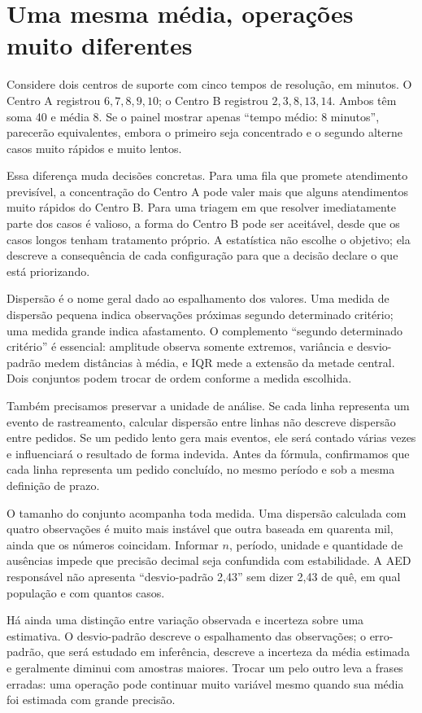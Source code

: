\section{Uma mesma média, operações muito diferentes}

Considere dois centros de suporte com cinco tempos de resolução, em minutos. O Centro A registrou $6,7,8,9,10$; o Centro B registrou $2,3,8,13,14$. Ambos têm soma 40 e média 8. Se o painel mostrar apenas ``tempo médio: 8 minutos'', parecerão equivalentes, embora o primeiro seja concentrado e o segundo alterne casos muito rápidos e muito lentos.

Essa diferença muda decisões concretas. Para uma fila que promete atendimento previsível, a concentração do Centro A pode valer mais que alguns atendimentos muito rápidos do Centro B. Para uma triagem em que resolver imediatamente parte dos casos é valioso, a forma do Centro B pode ser aceitável, desde que os casos longos tenham tratamento próprio. A estatística não escolhe o objetivo; ela descreve a consequência de cada configuração para que a decisão declare o que está priorizando.

Dispersão é o nome geral dado ao espalhamento dos valores. Uma medida de dispersão pequena indica observações próximas segundo determinado critério; uma medida grande indica afastamento. O complemento ``segundo determinado critério'' é essencial: amplitude observa somente extremos, variância e desvio-padrão medem distâncias à média, e IQR mede a extensão da metade central. Dois conjuntos podem trocar de ordem conforme a medida escolhida.

Também precisamos preservar a unidade de análise. Se cada linha representa um evento de rastreamento, calcular dispersão entre linhas não descreve dispersão entre pedidos. Se um pedido lento gera mais eventos, ele será contado várias vezes e influenciará o resultado de forma indevida. Antes da fórmula, confirmamos que cada linha representa um pedido concluído, no mesmo período e sob a mesma definição de prazo.

O tamanho do conjunto acompanha toda medida. Uma dispersão calculada com quatro observações é muito mais instável que outra baseada em quarenta mil, ainda que os números coincidam. Informar $n$, período, unidade e quantidade de ausências impede que precisão decimal seja confundida com estabilidade. A AED responsável não apresenta ``desvio-padrão 2,43'' sem dizer 2,43 de quê, em qual população e com quantos casos.

Há ainda uma distinção entre variação observada e incerteza sobre uma estimativa. O desvio-padrão descreve o espalhamento das observações; o erro-padrão, que será estudado em inferência, descreve a incerteza da média estimada e geralmente diminui com amostras maiores. Trocar um pelo outro leva a frases erradas: uma operação pode continuar muito variável mesmo quando sua média foi estimada com grande precisão.


